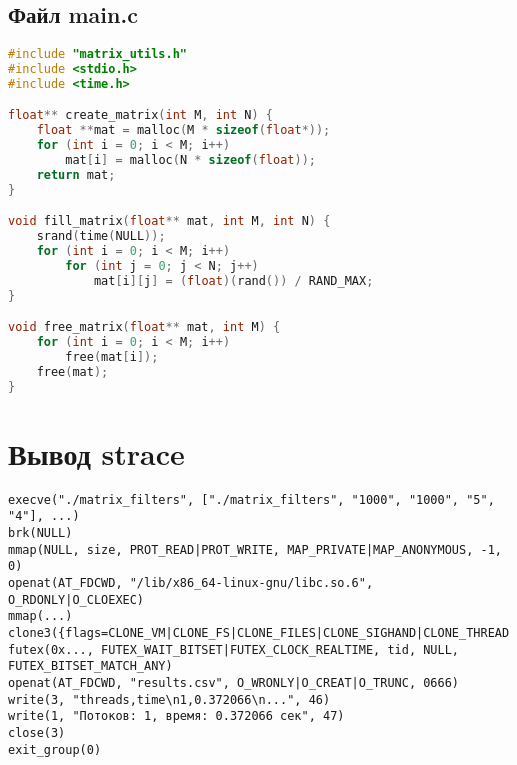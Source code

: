\subsection*{Файл main.c}

\begin{lstlisting}[language=C,caption={Файл main.c},captionpos=b]
#include "matrix_utils.h"
#include <stdio.h>
#include <time.h>

float** create_matrix(int M, int N) {
    float **mat = malloc(M * sizeof(float*));
    for (int i = 0; i < M; i++)
        mat[i] = malloc(N * sizeof(float));
    return mat;
}

void fill_matrix(float** mat, int M, int N) {
    srand(time(NULL));
    for (int i = 0; i < M; i++)
        for (int j = 0; j < N; j++)
            mat[i][j] = (float)(rand()) / RAND_MAX;
}

void free_matrix(float** mat, int M) {
    for (int i = 0; i < M; i++)
        free(mat[i]);
    free(mat);
}

\end{lstlisting}

\section{Вывод strace}

\begin{verbatim}
execve("./matrix_filters", ["./matrix_filters", "1000", "1000", "5", "4"], ...)
brk(NULL)
mmap(NULL, size, PROT_READ|PROT_WRITE, MAP_PRIVATE|MAP_ANONYMOUS, -1, 0)
openat(AT_FDCWD, "/lib/x86_64-linux-gnu/libc.so.6", O_RDONLY|O_CLOEXEC)
mmap(...)
clone3({flags=CLONE_VM|CLONE_FS|CLONE_FILES|CLONE_SIGHAND|CLONE_THREAD|...})
futex(0x..., FUTEX_WAIT_BITSET|FUTEX_CLOCK_REALTIME, tid, NULL, FUTEX_BITSET_MATCH_ANY)
openat(AT_FDCWD, "results.csv", O_WRONLY|O_CREAT|O_TRUNC, 0666)
write(3, "threads,time\n1,0.372066\n...", 46)
write(1, "Потоков: 1, время: 0.372066 сек", 47)
close(3)
exit_group(0)    
\end{verbatim}